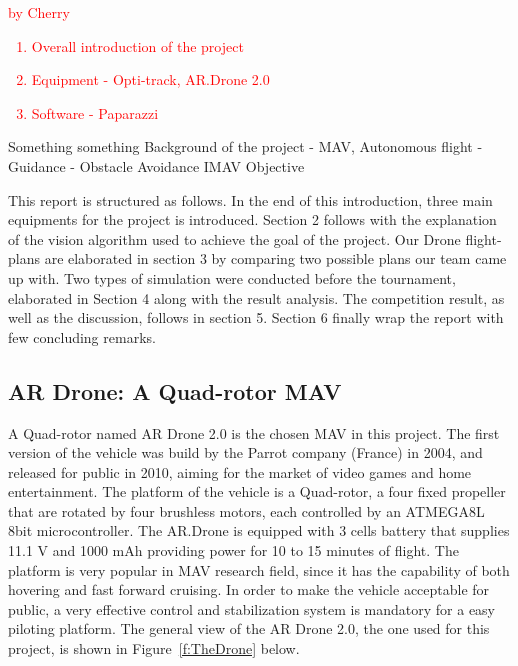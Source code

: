 \textcolor{red}{ 
by Cherry
\begin{enumerate}
	\item Overall introduction of the project
	\item Equipment - Opti-track, AR.Drone 2.0
	\item Software - Paparazzi
\end{enumerate}
}
Something something
Background of the project - MAV, Autonomous flight - Guidance - Obstacle Avoidance IMAV
Objective

This report is structured as follows. In the end of this introduction, three main equipments for the project is introduced. Section 2 follows with the explanation of the vision algorithm used to achieve the goal of the project. Our Drone flight-plans are elaborated in section 3 by comparing two possible plans our team came up with. Two types of simulation were conducted before the tournament, elaborated in Section 4 along with the result analysis. The competition result, as well as the discussion, follows in section 5. Section 6 finally wrap the report with few concluding remarks.

\subsection{AR Drone: A Quad-rotor MAV}
A Quad-rotor named AR Drone 2.0 is the chosen MAV in this project. The first version of the vehicle was build by the Parrot company (France) in 2004, and released for public in 2010, aiming for the market of video games and home entertainment\cite{Bristeau:11}. The platform of the vehicle is a Quad-rotor, a four fixed propeller that are rotated by four brushless motors, each controlled by an ATMEGA8L 8bit microcontroller. The AR.Drone is equipped with 3 cells battery that supplies 11.1 V and 1000 mAh providing power for 10 to 15 minutes of flight. The platform is very popular in MAV research field\cite{Bristeau:11}\cite{Pestana:13}\cite{Lugo:14}, since it has the capability of both hovering and fast forward cruising. In order to make the vehicle acceptable for public, a very effective control and stabilization system is mandatory for a easy piloting platform. The general view of the AR Drone 2.0, the one used for this project, is shown in Figure~\ref{f:TheDrone} below.

